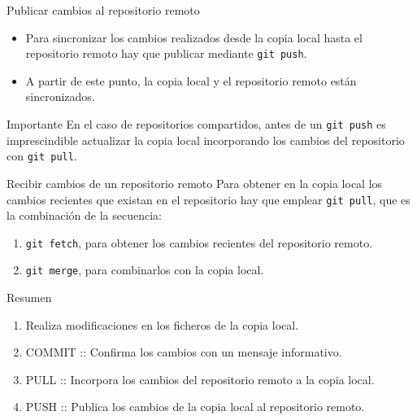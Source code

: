 \documentclass[xcolor={usenames,svgnames,dvipsnames}]{beamer}
\begin{document}
\begin{frame}[fragile,label={sec:orge6a0857}]{Publicar cambios al repositorio remoto}
 \begin{itemize}
\item Para sincronizar  los cambios realizados \alert{desde la copia local hasta el repositorio remoto} hay que publicar mediante \texttt{git push}.
\end{itemize}

\begin{center}
\end{center}

\begin{itemize}
\item A partir de este punto, la copia local y el repositorio remoto están sincronizados.
\end{itemize}

\begin{block}{Importante}
En el caso de repositorios compartidos, antes de un \texttt{git push} es imprescindible actualizar la copia local incorporando los cambios del repositorio con \texttt{git pull}.
\end{block}
\end{frame}
\begin{frame}[fragile,label={sec:org17ed654}]{Recibir cambios de un repositorio remoto}
 Para obtener en la copia local los cambios recientes que existan en el repositorio hay que emplear \texttt{git pull}, que es la combinación de la secuencia:
\begin{enumerate}
\item \texttt{git fetch}, para obtener los cambios recientes del repositorio remoto.
\item \texttt{git merge}, para combinarlos con la copia local.
\end{enumerate}

\begin{center}
\end{center}
\end{frame}
\begin{frame}[label={sec:org6f1c6d3}]{Resumen}
\begin{enumerate}
\item Realiza modificaciones en los ficheros de la copia local.
\item \alert{COMMIT} :: Confirma los cambios con un mensaje informativo.
\item \alert{PULL} :: Incorpora los cambios del repositorio remoto a la copia local.
\item \alert{PUSH} :: Publica los cambios de la copia local al repositorio remoto.
\end{enumerate}
\end{frame}
\end{document}

